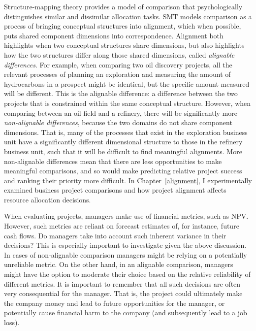 \documentclass[a4paper, nobind, dvipsnames]{templates/ociamthesis}
\theoremstyle{definition}
\theoremstyle{definition}
\theoremstyle{definition}
\theoremstyle{definition}
\theoremstyle{remark}
\begin{document}
Structure-mapping theory \autocites[SMT;][]{gentner1997,gentner1983} provides a model of
comparison that psychologically distinguishes similar and dissimilar allocation
tasks. SMT models comparison as a process of bringing conceptual structures into
alignment, which when possible, puts shared component dimensions into
correspondence. Alignment both highlights when two conceptual structures share
dimensions, but also highlights how the two structures differ along those shared
dimensions, called \emph{alignable differences}. For example, when comparing two oil
discovery projects, all the relevant processes of planning an exploration and
measuring the amount of hydrocarbons in a prospect might be identical, but the
specific amount measured will be different. This is the alignable difference: a
difference between the two projects that is constrained within the same
conceptual structure. However, when comparing between an oil field and a
refinery, there will be significantly more \emph{non-alignable differences}, because
the two domains do not share component dimensions. That is, many of the
processes that exist in the exploration business unit have a significantly
different dimensional structure to those in the refinery business unit, such
that it will be difficult to find meaningful alignments. More non-alignable
differences mean that there are less opportunities to make meaningful
comparisons, and so would make predicting relative project success and ranking
their priority more difficult. In Chapter~\ref{alignment}, I experimentally
examined business project comparisons and how project alignment affects resource
allocation decisions.

When evaluating projects, managers make use of financial metrics, such as NPV.
However, such metrics are reliant on forecast estimates of, for instance, future
cash flows. Do managers take into account such inherent variance in their
decisions? This is especially important to investigate given the above
discussion. In cases of non-alignable comparison managers might be relying on a
potentially unreliable metric. On the other hand, in an alignable comparison,
managers might have the option to moderate their choice based on the relative
reliability of different metrics. It is important to remember that all such
decisions are often very consequential for the manager. That is, the project
could ultimately make the company money and lead to future opportunities for the
manager, or potentially cause financial harm to the company (and subsequently
lead to a job loss).
\end{document}
